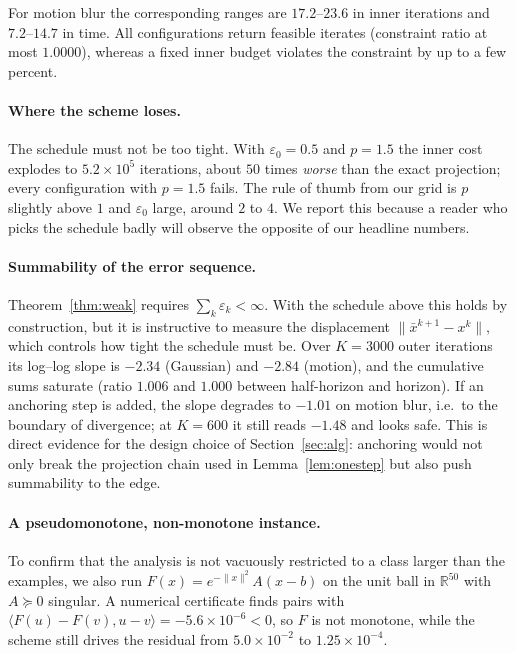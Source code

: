 \documentclass[11pt]{article}
\theoremstyle{plain}
\theoremstyle{definition}
\theoremstyle{remark}
\newcommand{\R}{\mathbb{R}}
\newcommand{\inner}[2]{\langle #1, #2 \rangle}
\newcommand{\norm}[1]{\lVert #1 \rVert}
\begin{document}
For motion blur the corresponding ranges are $17.2$--$23.6$ in inner iterations
and $7.2$--$14.7$ in time. All configurations return feasible iterates
(constraint ratio at most $1.0000$), whereas a fixed inner budget violates the
constraint by up to a few percent.

\paragraph{Where the scheme loses.}
The schedule must not be too tight. With $\varepsilon_0 = 0.5$ and $p=1.5$ the
inner cost explodes to $5.2\times10^{5}$ iterations, about $50$ times
\emph{worse} than the exact projection; every configuration with $p=1.5$ fails.
The rule of thumb from our grid is $p$ slightly above $1$ and $\varepsilon_0$
large, around $2$ to $4$. We report this because a reader who picks the
schedule badly will observe the opposite of our headline numbers.

\paragraph{Summability of the error sequence.}
Theorem~\ref{thm:weak} requires $\sum_k \varepsilon_k < \infty$. With the
schedule above this holds by construction, but it is instructive to measure the
displacement $\norm{\bar x^{k+1}-x^k}$, which controls how tight the schedule
must be. Over $K=3000$ outer iterations its log--log slope is $-2.34$
(Gaussian) and $-2.84$ (motion), and the cumulative sums saturate (ratio $1.006$
and $1.000$ between half-horizon and horizon). If an anchoring step is added,
the slope degrades to $-1.01$ on motion blur, i.e.\ to the boundary of
divergence; at $K=600$ it still reads $-1.48$ and looks safe. This is direct
evidence for the design choice of Section~\ref{sec:alg}: anchoring would not
only break the projection chain used in Lemma~\ref{lem:onestep} but also push
summability to the edge.

\paragraph{A pseudomonotone, non-monotone instance.}
To confirm that the analysis is not vacuously restricted to a class larger than
the examples, we also run $F(x) = e^{-\norm{x}^2} A(x-b)$ on the unit ball in
$\R^{50}$ with $A \succeq 0$ singular. A numerical certificate finds pairs with
$\inner{F(u)-F(v)}{u-v} = -5.6\times10^{-6} < 0$, so $F$ is not monotone, while
the scheme still drives the residual from $5.0\times10^{-2}$ to
$1.25\times10^{-4}$.
\end{document}
